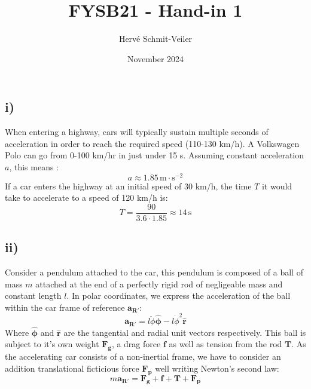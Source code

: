\documentclass{article}
\title{FYSB21 - Hand-in 1}
\author{Hervé Schmit-Veiler}
\date{November 2024}
\begin{document}
\maketitle

\section{}
\subsection*{i)}

When entering a highway, cars will typically sustain multiple seconds of acceleration in order to 
reach the required speed (110-130 km/h). A Volkswagen Polo can go from 0-100 km/hr in just under 15 s. 
Assuming constant acceleration $a$, this means :
$$a \approx 1.85 \,\si{\meter \cdot \s^{-2}}$$
If a car enters the highway at an initial speed of 30 km/h, the time $T$ it would take to accelerate to a speed of 
120 km/h is:
$$T = \frac{90}{3.6 \cdot 1.85} \approx 14 \,\si{\s}$$

\subsection*{ii)}
Consider a pendulum attached to the car, 
this pendulum is composed of a ball of mass $m$ attached at the end of a perfectly 
rigid rod of negligeable mass and constant length $l$. In polar coordinates, 
we express the acceleration of the ball within the car frame of reference $\bm{a_{R'}}$:
\begin{equation}
    \bm{a_{R'}} = l \ddot\phi \bm{\hat \phi} - l\dot\phi^2 \bm{\hat{r}}
\end{equation}
Where $\bm{\hat \phi}$ and $\bm{\hat r}$ are the tangential and radial unit vectors respectively.
This ball is subject to it's own weight $\bm{F_g}$, a drag force $\bm{f}$ as well as tension from the rod $\bm{T}$. As the accelerating car consists of a non-inertial frame, 
we have to consider an addition translational ficticious force $\bm{F_p}$ well writing Newton's second law:
\begin{equation}
    m \bm{a_{R'}} = \bm{F_g} + \bm{f} + \bm{T} + \bm{F_p}
    \label{eq:newton}
\end{equation}
\end{document}
